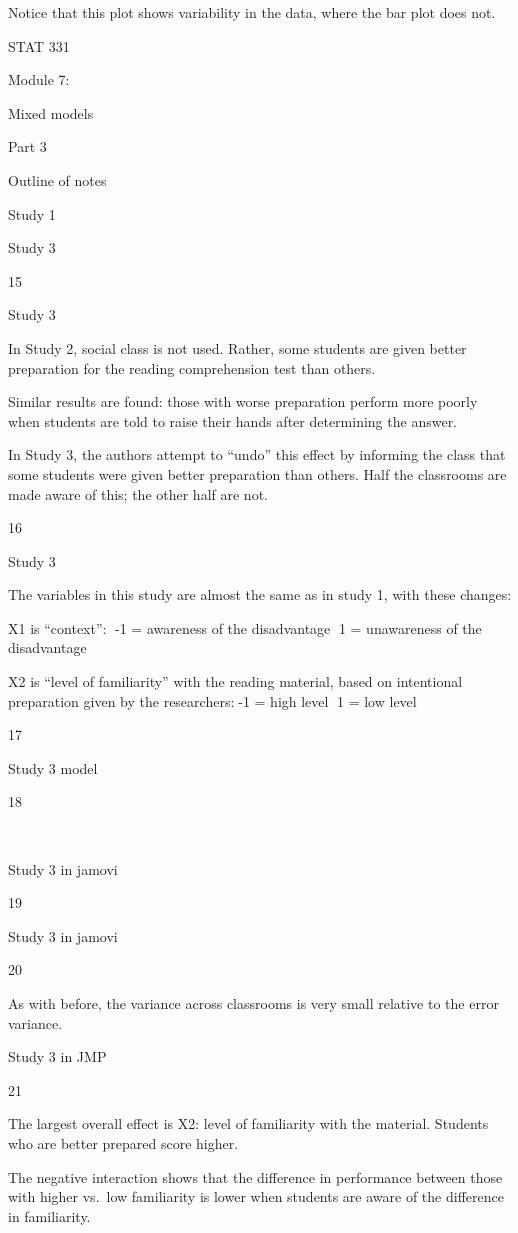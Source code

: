 \documentclass[
  letterpaper,
  DIV=11,
  numbers=noendperiod]{scrreprt}
\begin{document}
Notice that this plot shows variability in the data, where the bar plot
does not.

STAT 331

Module 7:

Mixed models

Part 3

Outline of notes

Study 1

Study 3

15

Study 3

In Study 2, social class is not used. Rather, some students are given
better preparation for the reading comprehension test than others.

Similar results are found: those with worse preparation perform more
poorly when students are told to raise their hands after determining the
answer.

In Study 3, the authors attempt to ``undo'' this effect by informing the
class that some students were given better preparation than others. Half
the classrooms are made aware of this; the other half are not.

16

Study 3

The variables in this study are almost the same as in study 1, with
these changes:

X1 is ``context'': -1 = awareness of the disadvantage 1 = unawareness of
the disadvantage

X2 is ``level of familiarity'' with the reading material, based on
intentional preparation given by the researchers:-1 = high level 1 = low
level

17

Study 3 model

18

~

Study 3 in jamovi

19

Study 3 in jamovi

20

As with before, the variance across classrooms is very small relative to
the error variance.

Study 3 in JMP

21

The largest overall effect is X2: level of familiarity with the
material. Students who are better prepared score higher.

The negative interaction shows that the difference in performance
between those with higher vs.~low familiarity is lower when students are
aware of the difference in familiarity.
\end{document}
